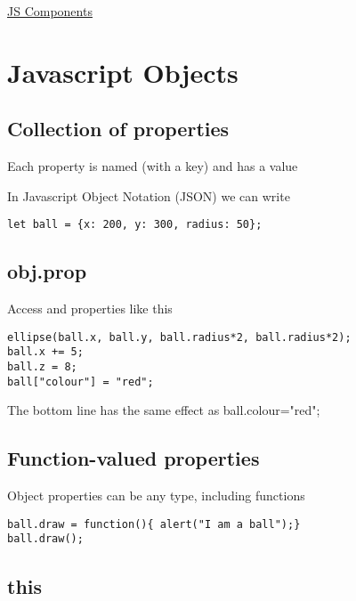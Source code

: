 \documentclass{article}[18pt]
\begin{document}
\begin{center}
\underline{\huge JS Components}
\end{center}


\hypertarget{javascript-objects}{%
	\section{Javascript Objects}\label{javascript-objects}}

\hypertarget{collection-of-properties}{%
	\subsection{Collection of properties}\label{collection-of-properties}}

Each property is named (with a key) and has a value

In Javascript Object Notation (JSON) we can write

\begin{verbatim}
let ball = {x: 200, y: 300, radius: 50};
\end{verbatim}

\hypertarget{obj.prop}{%
	\subsection{obj.prop}\label{obj.prop}}

Access and properties like this

\begin{verbatim}
ellipse(ball.x, ball.y, ball.radius*2, ball.radius*2);
ball.x += 5;
ball.z = 8;
ball["colour"] = "red";
\end{verbatim}
The bottom line has the same effect as ball.colour="red";

\hypertarget{function-valued-properties}{%
	\subsection{Function-valued
		properties}\label{function-valued-properties}}

Object properties can be any type, including functions

\begin{verbatim}
ball.draw = function(){ alert("I am a ball");}
ball.draw();
\end{verbatim}

\hypertarget{this}{%
	\subsection{this}\label{this}}
\end{document}
